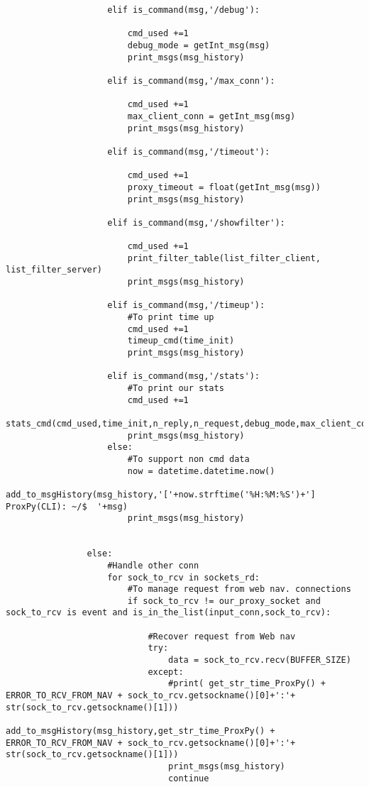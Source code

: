 \begin{verbatim}
                    elif is_command(msg,'/debug'):
                       
                        cmd_used +=1 
                        debug_mode = getInt_msg(msg)
                        print_msgs(msg_history)
                    
                    elif is_command(msg,'/max_conn'):
                        
                        cmd_used +=1 
                        max_client_conn = getInt_msg(msg)
                        print_msgs(msg_history)

                    elif is_command(msg,'/timeout'):
                       
                        cmd_used +=1 
                        proxy_timeout = float(getInt_msg(msg))
                        print_msgs(msg_history)

                    elif is_command(msg,'/showfilter'):
                        
                        cmd_used +=1
                        print_filter_table(list_filter_client, list_filter_server) 
                        print_msgs(msg_history)

                    elif is_command(msg,'/timeup'):
                        #To print time up 
                        cmd_used +=1
                        timeup_cmd(time_init)
                        print_msgs(msg_history)

                    elif is_command(msg,'/stats'):
                        #To print our stats 
                        cmd_used +=1
                        stats_cmd(cmd_used,time_init,n_reply,n_request,debug_mode,max_client_conn,BUFFER_SIZE,proxy_timeout,len(msg_history))
                        print_msgs(msg_history)
                    else:
                        #To support non cmd data
                        now = datetime.datetime.now()
                        add_to_msgHistory(msg_history,'['+now.strftime('%H:%M:%S')+'] ProxPy(CLI): ~/$  '+msg)
                        print_msgs(msg_history)
                        

                else:
            	    #Handle other conn
                    for sock_to_rcv in sockets_rd:
                        #To manage request from web nav. connections 
                        if sock_to_rcv != our_proxy_socket and sock_to_rcv is event and is_in_the_list(input_conn,sock_to_rcv):
                
                            #Recover request from Web nav
                            try:
                                data = sock_to_rcv.recv(BUFFER_SIZE)
                            except:
                                #print( get_str_time_ProxPy() + ERROR_TO_RCV_FROM_NAV + sock_to_rcv.getsockname()[0]+':'+ str(sock_to_rcv.getsockname()[1]))
                                add_to_msgHistory(msg_history,get_str_time_ProxPy() + ERROR_TO_RCV_FROM_NAV + sock_to_rcv.getsockname()[0]+':'+ str(sock_to_rcv.getsockname()[1]))
                                print_msgs(msg_history)
                                continue
                                

\end{verbatim}
